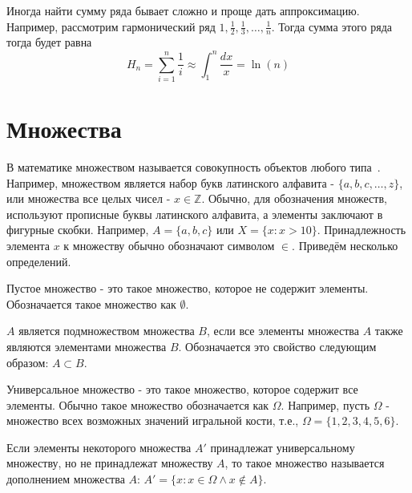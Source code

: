 Иногда найти сумму ряда бывает сложно и проще дать аппроксимацию.
Например, рассмотрим гармонический ряд $1, \frac{1}{2}, \frac{1}{3}, \ldots,\frac{1}{n}$. 
Тогда сумма этого ряда тогда будет равна $$H_n = \sum_{i=1}^n\frac{1}{i} \approx \int_1^n\frac{dx}{x} = \ln(n)$$

\section{Множества}

В математике множеством называется совокупность объектов любого типа~\cite{turner:probability}.
Например, множеством является набор букв латинского алфавита - $\{a, b, c, \ldots, z\}$, или множества 
все целых чисел - $x \in \mathbb{Z}$. Обычно, для обозначения множеств, используют прописные буквы 
латинского алфавита, а элементы заключают в фигурные скобки. Например, $A=\{a, b, c\}$ или 
$X=\{x: x > 10\}$. Принадлежность элемента $x$ к множеству обычно обозначают символом $\in$.
Приведём несколько определений.

\begin{definition}
Пустое множество - это такое множество, которое не содержит элементы. Обозначается
такое множество как $\emptyset$. 
\end{definition}

\begin{definition}
$A$ является подмножеством множества $B$, если все элементы
множества $A$ также являются элементами множества $B$. Обозначается это свойство следующим образом:
$A \subset B$. 
\end{definition}


\begin{definition}

Универсальное множество - это такое множество, которое содержит все 
элементы. Обычно такое множество обозначается как $\Omega$. Например, пусть $\Omega$ - множество 
всех возможных значений игральной кости, т.е., $\Omega = \{1, 2, 3, 4, 5, 6\}$. 
\end{definition}

\begin{definition}
Если элементы некоторого множества $A'$ принадлежат универсальному множеству, но не принадлежат
множеству $A$, то такое множество называется дополнением множества $A$: 
$A' = \{x: x \in \Omega \wedge x \notin A\}$.
\end{definition}

